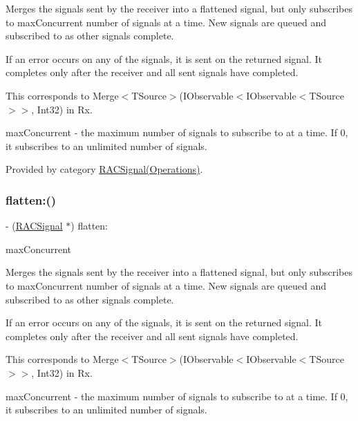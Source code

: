 Merges the signals sent by the receiver into a flattened signal, but only subscribes to {\ttfamily max\+Concurrent} number of signals at a time. New signals are queued and subscribed to as other signals complete.

If an error occurs on any of the signals, it is sent on the returned signal. It completes only after the receiver and all sent signals have completed.

This corresponds to {\ttfamily Merge$<$T\+Source$>$(I\+Observable$<$I\+Observable$<$T\+Source$>$$>$, Int32)} in Rx.

max\+Concurrent -\/ the maximum number of signals to subscribe to at a time. If 0, it subscribes to an unlimited number of signals. 

Provided by category \mbox{\hyperlink{category_r_a_c_signal_07_operations_08_a72e5f2fd80960ee5422e08ceef0f4e2c}{R\+A\+C\+Signal(\+Operations)}}.

\mbox{\label{interface_r_a_c_signal_a72e5f2fd80960ee5422e08ceef0f4e2c}} 
\subsubsection{\texorpdfstring{flatten\+:()}{flatten:()}\hspace{0.1cm}{\footnotesize\ttfamily [3/3]}}
{\footnotesize\ttfamily -\/ (\mbox{\hyperlink{interface_r_a_c_signal}{R\+A\+C\+Signal}} $\ast$) flatten\+: \begin{DoxyParamCaption}\item[{(N\+S\+U\+Integer)}]{max\+Concurrent }\end{DoxyParamCaption}}

Merges the signals sent by the receiver into a flattened signal, but only subscribes to {\ttfamily max\+Concurrent} number of signals at a time. New signals are queued and subscribed to as other signals complete.

If an error occurs on any of the signals, it is sent on the returned signal. It completes only after the receiver and all sent signals have completed.

This corresponds to {\ttfamily Merge$<$T\+Source$>$(I\+Observable$<$I\+Observable$<$T\+Source$>$$>$, Int32)} in Rx.

max\+Concurrent -\/ the maximum number of signals to subscribe to at a time. If 0, it subscribes to an unlimited number of signals. 

